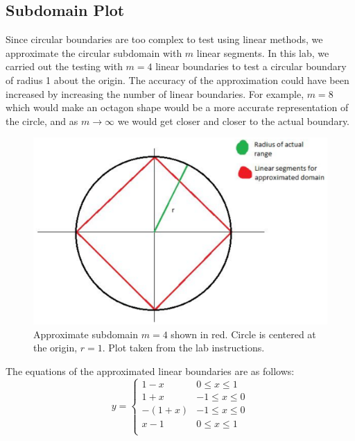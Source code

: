 \documentclass[letterpaper]{article}
\begin{document}
\subsection{Subdomain Plot}
Since circular boundaries are too complex to test using linear methods,
we approximate the circular subdomain with $m$ linear segments. In this lab,
we carried out the testing with $m=4$ linear boundaries to test a circular
boundary of radius 1 about the origin. The accuracy of the approximation
could have been increased by increasing the number of linear boundaries.
For example, $m=8$ which would make an octagon shape would be a more accurate
representation of the circle, and as $m \to \infty$ we would get closer
and closer to the actual boundary.

\begin{figure}[h]
	\centering
	\includegraphics{remotecar-subdomain.png}
	\caption{Approximate subdomain $m=4$ shown in red.
		Circle is centered at the origin, $r=1$.
	        Plot taken from the lab instructions.}
\end{figure}

The equations of the approximated linear boundaries are as follows:
	\[ y= \begin{cases} 
      1-x &  0 \leq x \leq 1 \\
      1+x &  -1 \leq x \leq 0 \\
      -(1+x) &  -1 \leq x \leq 0 \\
      x-1 &  0 \leq x \leq 1 \\
   \end{cases}
\]
\FloatBarrier
\end{document}
